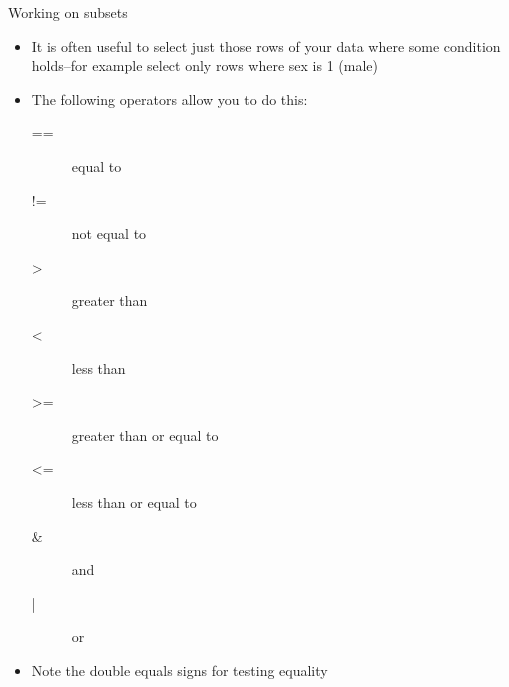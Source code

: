 \documentclass[table,smaller]{beamer}
\begin{document}
\begin{frame}[label=sec-4-4]{Working on subsets}
\begin{itemize}
\item It is often useful to select just those rows of your data where some condition holds--for example select only rows where sex is 1 (male)
\item The following operators allow you to do this:
\begin{description}
\item[{==}] equal to
\item[{!=}] not equal to
\item[{>}] greater than
\item[{<}] less than
\item[{>=}] greater than or equal to
\item[{<=}] less than or equal to
\item[{\&}] and
\item[{|}] or
\end{description}
\item Note the double equals signs for testing equality
\end{itemize}
\end{frame}
\end{document}
